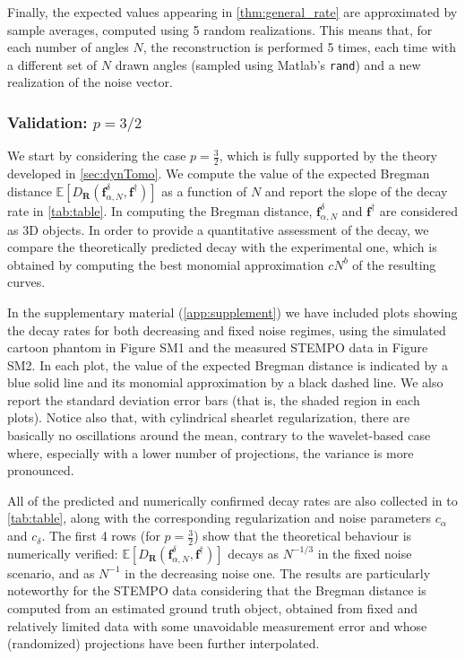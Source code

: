 \documentclass[11pt,a4paper]{article}
\numberwithin{equation}{section}
\renewcommand{\vec}[1]{\boldsymbol{#1}} %
\newcommand{\f}{\vec{f}} %
\newcommand{\faNd}{\f_{\alpha,N}^{\delta}} %
\newcommand{\E}{\mathbb{E}}
\begin{document}
Finally, the expected values appearing in \cref{thm:general_rate} are approximated by sample averages, computed using 5 random realizations. This means that, for each number of angles $N$, the reconstruction is performed 5 times, each time with a different set of $N$ drawn angles (sampled using Matlab’s \texttt{rand}) and a new realization of the noise vector.

\subsubsection{Validation: \texorpdfstring{$p = 3/2$}{p = 3/2}} 

We start by considering the case $p = \frac{3}{2}$, which is fully supported by the theory developed in \cref{sec:dynTomo}. 
We compute the value of the expected Bregman distance $\E \left[D_{\vec{R}}(\faNd, \f^\dag) \right]$ as a function of $N$ and report the slope of the decay rate in \cref{tab:table}. 
In computing the Bregman distance, $\faNd$ and $\f^\dag$ are considered as 3D objects.
In order to provide a quantitative assessment of the decay, we compare the theoretically predicted decay with the experimental one, which is obtained by computing the best monomial approximation $c N^{b}$ of the resulting curves. 

In the supplementary material (\cref{app:supplement}) we have included plots showing the decay rates for both decreasing and fixed noise regimes, using the simulated cartoon phantom in Figure SM1 %
and the measured STEMPO data in Figure SM2. %
In each plot, the value of the expected Bregman distance is indicated by a blue solid line and its monomial approximation by a black dashed line. We also report the standard deviation error bars (that is, the shaded region in each plots).
Notice also that, with cylindrical shearlet regularization, there are basically no oscillations around the mean, contrary to the wavelet-based case where, especially with a lower number of projections, the variance is more pronounced.  

All of the predicted and numerically confirmed decay rates are also collected in to \cref{tab:table}, along with the corresponding regularization and noise parameters $c_\alpha$ and $c_\delta$. The first 4 rows (for $p = \frac{3}{2}$) show that the theoretical behaviour is numerically verified: $\E \left[D_{\vec{R}}(\faNd, \f^\dag) \right]$ decays as $N^{-1/3}$ in the fixed noise scenario, and as $N^{-1}$ in the decreasing noise one. 
The results are particularly noteworthy for the STEMPO data considering that the Bregman distance is computed from an estimated ground truth object, obtained from fixed and relatively limited data with some unavoidable measurement error and whose (randomized) projections have been further interpolated.
\end{document}

